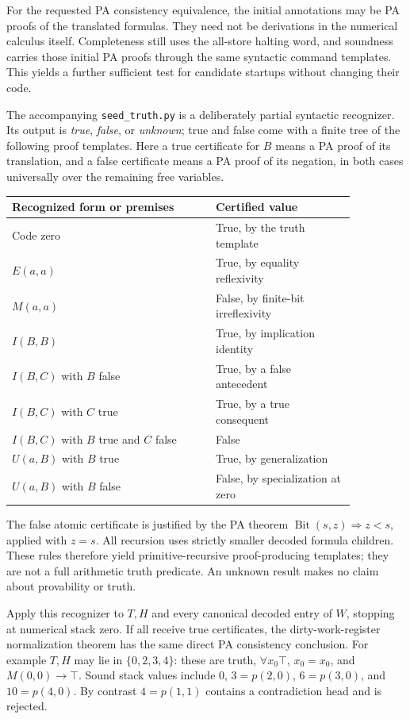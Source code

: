 For the requested PA consistency equivalence, the initial annotations may
be PA proofs of the translated formulas. They need not be derivations in
the numerical calculus itself. Completeness still uses the all-store
halting word, and soundness carries those initial PA proofs through the
same syntactic command templates. This yields a further sufficient test
for candidate startups without changing their code.

The accompanying \texttt{seed\_truth.py} is a deliberately partial
syntactic recognizer. Its output is \emph{true}, \emph{false}, or
\emph{unknown}; true and false come with a finite tree of the following
proof templates. Here a true certificate for $B$ means a PA proof of its
translation, and a false certificate means a PA proof of its negation,
in both cases universally over the remaining free variables.
\begin{center}\small
\begin{tabular}{p{0.51\linewidth}p{0.35\linewidth}}
\toprule
Recognized form or premises&Certified value\\
\midrule
Code zero&True, by the truth template\\
$E(a,a)$&True, by equality reflexivity\\
$M(a,a)$&False, by finite-bit irreflexivity\\
$I(B,B)$&True, by implication identity\\
$I(B,C)$ with $B$ false&True, by a false antecedent\\
$I(B,C)$ with $C$ true&True, by a true consequent\\
$I(B,C)$ with $B$ true and $C$ false&False\\
$U(a,B)$ with $B$ true&True, by generalization\\
$U(a,B)$ with $B$ false&False, by specialization at zero\\
\bottomrule
\end{tabular}
\end{center}
The false atomic certificate is justified by the PA theorem
$\operatorname{Bit}(s,z)\Rightarrow z<s$, applied with $z=s$.
All recursion uses strictly smaller decoded formula children. These
rules therefore yield primitive-recursive proof-producing templates;
they are not a full arithmetic truth predicate. An unknown result makes
no claim about provability or truth.

Apply this recognizer to $T,H$ and every canonical decoded entry of
$W$, stopping at numerical stack zero. If all receive true certificates,
the dirty-work-register normalization theorem has the same direct PA
consistency conclusion. For example $T,H$ may lie in $\{0,2,3,4\}$:
these are truth, $\forall x_0\top$, $x_0=x_0$, and
$M(0,0)\to\top$. Sound stack values include $0$, $3=p(2,0)$,
$6=p(3,0)$, and $10=p(4,0)$. By contrast $4=p(1,1)$ contains a
contradiction head and is rejected.

